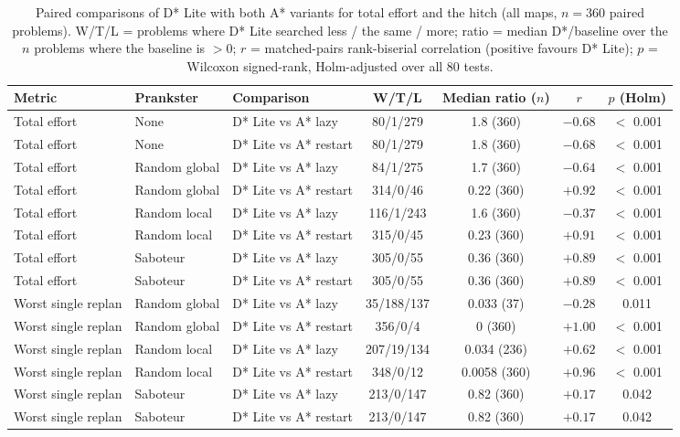 \begin{table}[!t]
\centering
\footnotesize
\caption{Paired comparisons of D* Lite with both A* variants for total effort and the hitch (all maps, $n=360$ paired problems). W/T/L = problems where D* Lite searched less / the same / more; ratio = median D*/baseline over the $n$ problems where the baseline is $>0$; $r$ = matched-pairs rank-biserial correlation (positive favours D* Lite); $p$ = Wilcoxon signed-rank, Holm-adjusted over all 80 tests.}
\label{tab:tests}
\begin{tabular}{lllcccc}
\toprule
Metric & Prankster & Comparison & W/T/L & Median ratio ($n$) & $r$ & $p$ (Holm) \\
\midrule
Total effort & None & D* Lite vs A* lazy & 80/1/279 & 1.8 (360) & $-0.68$ & $<$ 0.001 \\
Total effort & None & D* Lite vs A* restart & 80/1/279 & 1.8 (360) & $-0.68$ & $<$ 0.001 \\
Total effort & Random global & D* Lite vs A* lazy & 84/1/275 & 1.7 (360) & $-0.64$ & $<$ 0.001 \\
Total effort & Random global & D* Lite vs A* restart & 314/0/46 & 0.22 (360) & $+0.92$ & $<$ 0.001 \\
Total effort & Random local & D* Lite vs A* lazy & 116/1/243 & 1.6 (360) & $-0.37$ & $<$ 0.001 \\
Total effort & Random local & D* Lite vs A* restart & 315/0/45 & 0.23 (360) & $+0.91$ & $<$ 0.001 \\
Total effort & Saboteur & D* Lite vs A* lazy & 305/0/55 & 0.36 (360) & $+0.89$ & $<$ 0.001 \\
Total effort & Saboteur & D* Lite vs A* restart & 305/0/55 & 0.36 (360) & $+0.89$ & $<$ 0.001 \\
\midrule
Worst single replan & Random global & D* Lite vs A* lazy & 35/188/137 & 0.033 (37) & $-0.28$ & 0.011 \\
Worst single replan & Random global & D* Lite vs A* restart & 356/0/4 & 0 (360) & $+1.00$ & $<$ 0.001 \\
Worst single replan & Random local & D* Lite vs A* lazy & 207/19/134 & 0.034 (236) & $+0.62$ & $<$ 0.001 \\
Worst single replan & Random local & D* Lite vs A* restart & 348/0/12 & 0.0058 (360) & $+0.96$ & $<$ 0.001 \\
Worst single replan & Saboteur & D* Lite vs A* lazy & 213/0/147 & 0.82 (360) & $+0.17$ & 0.042 \\
Worst single replan & Saboteur & D* Lite vs A* restart & 213/0/147 & 0.82 (360) & $+0.17$ & 0.042 \\
\bottomrule
\end{tabular}
\end{table}
